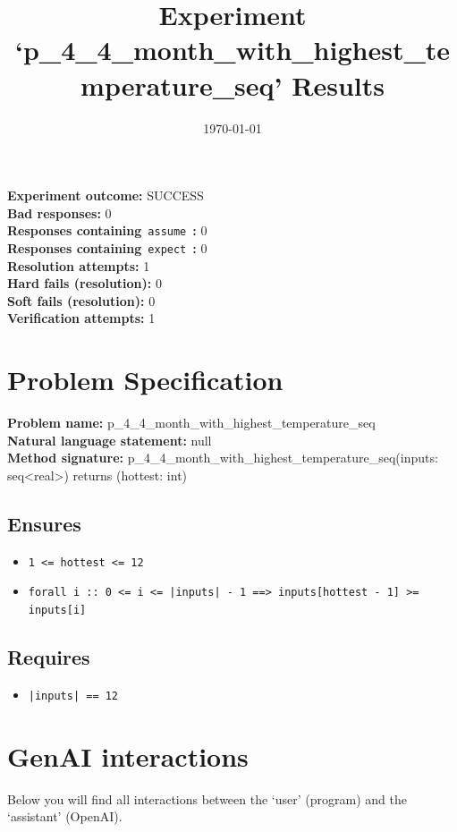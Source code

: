 \documentclass{article}
\begin{document}
\title{Experiment `p\_4\_4\_month\_with\_highest\_temperature\_seq' Results}
\author{\today}
\date{}
\maketitle
\textbf{Experiment outcome: }SUCCESS
\\\textbf{Bad responses: }0
\\\textbf{Responses containing}~\texttt{assume}~\textbf{: }0
\\\textbf{Responses containing}~\texttt{expect}~\textbf{: }0
\\\textbf{Resolution attempts: }1
\\\textbf{Hard fails (resolution): }0
\\\textbf{Soft fails (resolution): }0
\\\textbf{Verification attempts: }1
\section*{Problem Specification}
\textbf{Problem name: }p\_4\_4\_month\_with\_highest\_temperature\_seq
\\\textbf{Natural language statement: }null
\\\textbf{Method signature: }p\_4\_4\_month\_with\_highest\_temperature\_seq(inputs: seq<real>) returns (hottest: int)
\subsection*{Ensures}
\begin{itemize}
\item \texttt{1 <= hottest <= 12}
\item \texttt{forall i :: 0 <= i <= |inputs| - 1 ==> inputs[hottest - 1] >= inputs[i]}
\end{itemize}
\subsection*{Requires}
\begin{itemize}
\item \texttt{|inputs| == 12}
\end{itemize}
\clearpage
\section*{GenAI interactions}
Below you will find all interactions between the `user' (program) and the `assistant' (OpenAI).
\end{document}
